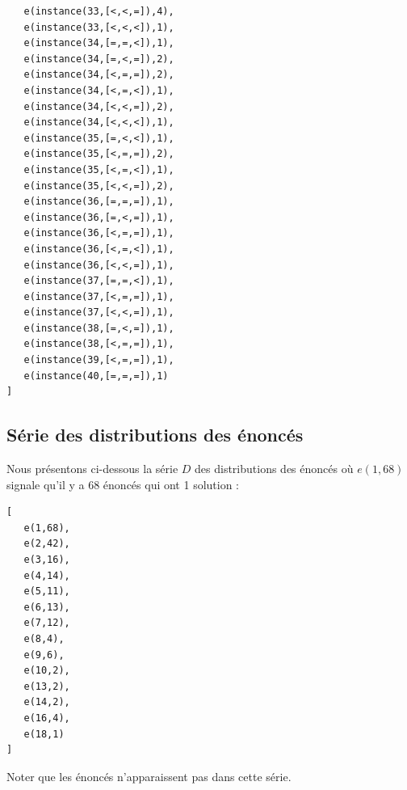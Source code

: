 \documentclass[a4paper, 12]{article}
\begin{document}
\begin{verbatim}
   e(instance(33,[<,<,=]),4),
   e(instance(33,[<,<,<]),1),
   e(instance(34,[=,=,<]),1),
   e(instance(34,[=,<,=]),2),
   e(instance(34,[<,=,=]),2),
   e(instance(34,[<,=,<]),1),
   e(instance(34,[<,<,=]),2),
   e(instance(34,[<,<,<]),1),
   e(instance(35,[=,<,<]),1),
   e(instance(35,[<,=,=]),2),
   e(instance(35,[<,=,<]),1),
   e(instance(35,[<,<,=]),2),
   e(instance(36,[=,=,=]),1),
   e(instance(36,[=,<,=]),1),
   e(instance(36,[<,=,=]),1),
   e(instance(36,[<,=,<]),1),
   e(instance(36,[<,<,=]),1),
   e(instance(37,[=,=,<]),1),
   e(instance(37,[<,=,=]),1),
   e(instance(37,[<,<,=]),1),
   e(instance(38,[=,<,=]),1),
   e(instance(38,[<,=,=]),1),
   e(instance(39,[<,=,=]),1),
   e(instance(40,[=,=,=]),1)
]
\end{verbatim}

\subsection{Série des distributions des énoncés}
\label{annexe2}

Nous présentons ci-dessous la série $D$ des distributions des énoncés où $e(1,68)$ signale qu'il y a 68 énoncés qui ont 1 solution :
\begin{verbatim}
[
   e(1,68),
   e(2,42),
   e(3,16),
   e(4,14),
   e(5,11),
   e(6,13),
   e(7,12),
   e(8,4),
   e(9,6),
   e(10,2),
   e(13,2),
   e(14,2),
   e(16,4),
   e(18,1)
]
\end{verbatim}

Noter que les énoncés n'apparaissent pas dans cette série.
\end{document}
